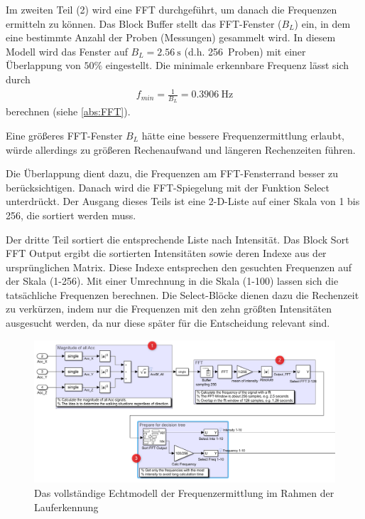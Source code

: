 Im zweiten Teil (2) wird eine FFT durchgeführt, um danach die Frequenzen ermitteln zu können. Das Block \glqq Buffer\grqq{} stellt das FFT-Fenster ($B_L$) ein, in dem eine bestimmte Anzahl der Proben (Messungen) gesammelt wird. In diesem Modell wird das Fenster auf $B_L = \SI{2,56}{\second}$ (d.h. \SI{256}{Proben}) mit einer Überlappung von $50\%$ eingestellt. Die minimale erkennbare Frequenz lässt sich durch
\begin{align*}
	f_{min} = \frac{1}{B_L} = \SI{0,3906}{\hertz}
\end{align*}
berechnen (siehe \autoref{abs:FFT}).

Eine größeres FFT-Fenster $B_L$ hätte eine bessere Frequenzermittlung erlaubt, würde allerdings zu größeren Rechenaufwand und längeren Rechenzeiten führen. 

Die Überlappung dient dazu, die Frequenzen am FFT-Fensterrand besser zu be\-rück\-sichtigen. Danach wird die FFT-Spiegelung mit der Funktion \glqq Select\grqq{} unterdrückt. Der Ausgang dieses Teils ist eine 2-D-Liste auf einer Skala von 1 bis 256, die sortiert werden muss.

Der dritte Teil sortiert die entsprechende Liste nach Intensität. Das Block \glqq Sort FFT Output\grqq{} ergibt die sortierten Intensitäten sowie deren Indexe aus der ursprünglichen Matrix. Diese Indexe entsprechen den gesuchten Frequenzen auf der Skala (1-256). Mit einer Umrechnung in die Skala (1-100) lassen sich die tatsächliche Frequenzen berechnen. Die \glqq Select\grqq{}-Blöcke dienen dazu die Rechenzeit zu verkürzen, indem nur die Frequenzen mit den zehn größten Intensitäten ausgesucht werden, da nur diese später für die Entscheidung relevant sind.

\begin{figure}[htpb]
	\centering
	\includegraphics[width=\linewidth]{Bilder/Lauferkennung_Modell_1_1.png}
	\caption{Das vollständige Echtmodell der Frequenzermittlung im Rahmen der Lauferkennung}
	\label{fig:Lauferkennung_Freqbasiert_FFT_Echtmodell}
\end{figure}

